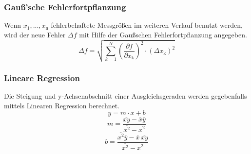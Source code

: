 \subsubsection{Gauß'sche Fehlerfortpflanzung}
Wenn $x_1, ..., x_\text{n}$ fehlerbehaftete Messgrößen im weiteren Verlauf benutzt werden, wird der neue Fehler $\Delta f$ mit Hilfe der Gaußschen Fehlerfortpflanzung angegeben.
\begin{equation}
	\Delta f = \sqrt{\sum_{k=1}^N \left( \frac{ \partial f}{\partial x_\text{k}} \right) ^2 \cdot (\Delta x_\text{k})^2}
\end{equation}

\subsubsection{Lineare Regression}
Die Steigung und y-Achsenabschnitt einer Ausgleichsgeraden werden gegebenfalls mittels Linearen Regression berechnet.
\begin{equation}
	y = m \cdot x + b
\end{equation}
\begin{equation}
	m = \frac{ \overline{xy} - \overline{x} \overline{y} } {\overline{x^2} - \overline{x}^2}
\end{equation}
\begin{equation}
	b = \frac{ \overline{x^2}\overline{y} - \overline{x} \, \overline{xy}} { \overline{x^2} - \overline{x}^2}
\end{equation}

\cite{sample}
